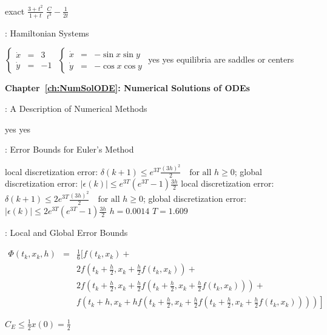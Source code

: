  \ans exact
 \ans $\frac{3 + t^2}{1 + t}$
 \ans $\frac{C}{t^3} - \frac{1}{2t}$ 

: Hamiltonian Systems

 \ans $\left\{\begin{array}{rcl}
	\dot{x} & = & 3 \\ \dot{y} & = & -1 \end{array}\right.$
 \ans $\left\{\begin{array}{rcl}
\dot{x} & = & -\sin x\sin y \\ \dot{y} & = & -\cos x\cos y \end{array}\right.$
 \ans yes
 \ans yes
 \ans equilibria are saddles or centers


\vspace{0.08in}
{\bf Chapter~\ref{ch:NumSolODE}: Numerical Solutions of ODEs}

: A Description of Numerical Methods

 \ans yes
 \ans yes

: Error Bounds for Euler's Method


 \ans local discretization error:
$\delta(k+1) \le
e^{3T}\frac{(3h)^2}{2} \quad \mbox{for all $h\ge 0$}$; 
global discretization error:
$|\epsilon(k)| \le e^{3T}(e^{3T}-1)\frac{3h}{2}$
 \ans local discretization error:
$\delta(k+1) \le
2e^{3T}\frac{(3h)^2}{2} \quad \mbox{for all $h\ge 0$}$;
global discretization error:
$|\epsilon(k)| \le 2e^{3T}(e^{3T}-1)\frac{3h}{2}$
 \ans $h=0.0014$
 \ans $T=1.609$


: Local and Global Error Bounds

 \ans
\begin{eqnarray*}
\Phi(t_k,x_k,h) & = & \frac{1}{6}\Big[f(t_k,x_k)+\\
&&2f\left(t_k+\frac{h}{2},x_k+\frac{h}{2}f(t_k,x_k)\right) +\\
&&2f\left(t_k+\frac{h}{2},x_k+
  \frac{h}{2}f\left(t_k+\frac{h}{2},x_k+\frac{h}{2}f(t_k,x_k)\right)\right)+\\
&&\left.f\left(t_k+h,x_k+hf\left(t_k+\frac{h}{2},x_k+
  \frac{h}{2}f\left(t_k+\frac{h}{2},x_k+
  \frac{h}{2}f(t_k,x_k)\right)\right)\right)\right]
\end{eqnarray*}

 \ans $C_E \le \frac{1}{2}x(0)=\frac{1}{2}$




